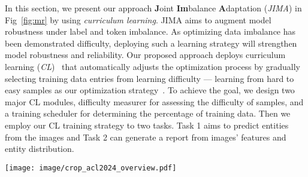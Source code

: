 \documentclass[sn-mathphys-num]{sn-jnl}%
\theoremstyle{thmstyleone}%
\theoremstyle{thmstyletwo}%
\theoremstyle{thmstylethree}%
\begin{document}
In this section, we present our approach \textbf{J}oint \textbf{Im}balance \textbf{A}daptation (\textit{JIMA}) in Fig~\ref{fig:mr} by using \textit{curriculum learning}.
JIMA aims to augment model robustness under label and token imbalance.
As optimizing data imbalance has been demonstrated difficulty, deploying such a learning strategy will strengthen model robustness and reliability.
Our proposed approach deploys curriculum learning (\textit{CL})~\cite{wang2022survey} that automatically adjusts the optimization process by gradually selecting training data entries from learning difficulty --- learning from hard to easy samples as our optimization strategy~\cite{zhou2020advances}.
To achieve the goal, we design two major CL modules, difficulty measurer for assessing the difficulty of samples, and a training scheduler for determining the percentage of training data.
Then we employ our CL training strategy to two tasks. 
Task 1 aims to predict entities from the images and Task 2 can generate a report from images' features and entity distribution.

\begin{figure*}[htp]
    \label{overview}
    \centering
    \caption{JIMA has two  tasks. Task 1 aims to predict entity distribution from images, and task 2 aims to generate report from image's feature and entity distribution. We assign one color per task and solid arrows as workflows. }
    \texttt{[image: image/crop\_acl2024\_overview.pdf]}
    \label{fig:mr}
\end{figure*}
\end{document}
